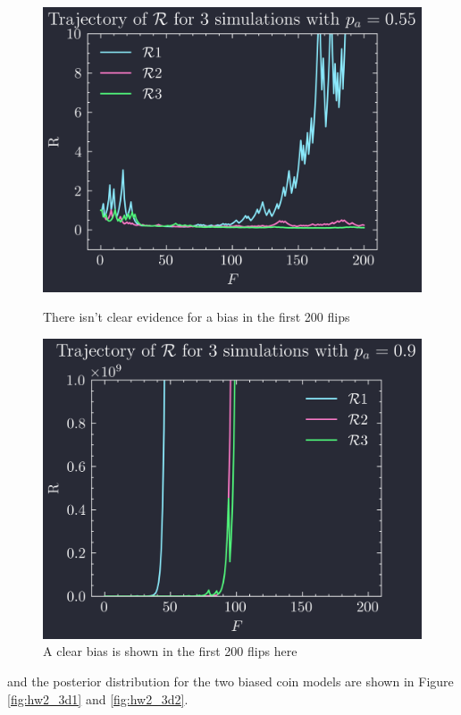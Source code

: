 \documentclass[../main.tex]{subfiles}
\begin{document}
\begin{figure}[h!]
    \centering
    \begin{minipage}{0.5\textwidth}
        \centering
        \includegraphics[width=0.8\linewidth]{hw2_3c1.png}
        \captionsetup{width=0.8\linewidth}
        \caption{There isn't clear evidence for a bias in the first 200 flips}
        \label{fig:hw2_3c1}
    \end{minipage}%
    \begin{minipage}{0.5\textwidth}
        \centering
        \includegraphics[width=0.8\linewidth]{hw2_3c2.png}
        \captionsetup{width=0.8\linewidth}
        \caption{A clear bias is shown in the first 200 flips here}
        \label{fig:hw2_3c2}
    \end{minipage}
\end{figure}

and the posterior distribution for the two biased coin models are shown in Figure \ref{fig:hw2_3d1}
and \ref{fig:hw2_3d2}.
\end{document}
